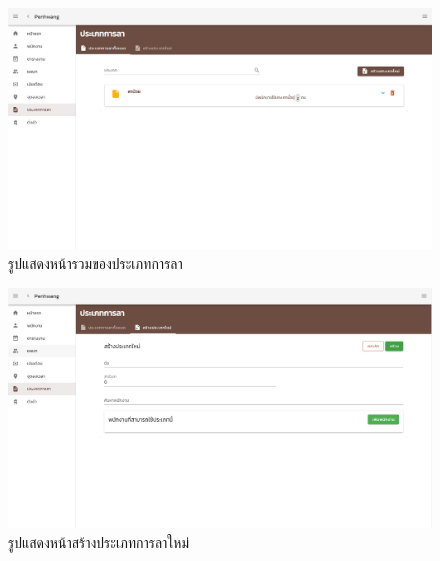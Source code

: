 \begin{figure}
  \begin{center}
    \includegraphics[width=14cm,keepaspectratio]{./images/leave.jpg}
  \end{center}
  \caption[รูปแสดงหน้ารวมของประเภทการลา]{รูปแสดงหน้ารวมของประเภทการลา} 
  \label{fig:leave}
\end{figure}

\begin{figure}
  \begin{center}
    \includegraphics[width=14cm,keepaspectratio]{./images/new_leave.jpg}
  \end{center}
  \caption[รูปแสดงหน้าสร้างประเภทการลาใหม่]{รูปแสดงหน้าสร้างประเภทการลาใหม่} 
  \label{fig:new_leave}
\end{figure} 

